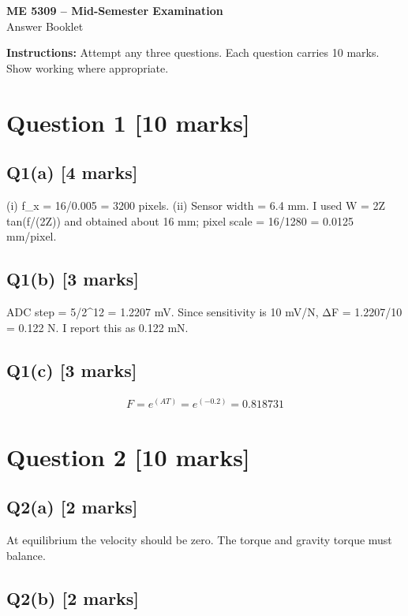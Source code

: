 \documentclass[11pt,a4paper]{article}
\begin{document}
\begin{center}
{\Large\bfseries ME 5309 -- Mid-Semester Examination}\\[3pt]
{\large Answer Booklet}\\[8pt]
\end{center}
\textbf{Instructions:} Attempt any three questions. Each question carries 10 marks. Show working where appropriate.
\section*{Question 1 \hfill [10 marks]}
\subsection*{Q1(a) \hfill [4 marks]}

(i) f\_x = 16/0.005 = 3200 pixels.
(ii) Sensor width = 6.4 mm.
I used W = 2Z tan(f/(2Z)) and obtained about 16 mm; pixel scale = 16/1280 = 0.0125 mm/pixel.

\subsection*{Q1(b) \hfill [3 marks]}

ADC step = 5/2\textasciicircum{}12 = 1.2207 mV.
Since sensitivity is 10 mV/N, ΔF = 1.2207/10 = 0.122 N.
I report this as 0.122 mN.

\subsection*{Q1(c) \hfill [3 marks]}

\[\begin{aligned}F = e^(AT) = e^(-0.2) = 0.818731\end{aligned}\]

\section*{Question 2 \hfill [10 marks]}
\subsection*{Q2(a) \hfill [2 marks]}

At equilibrium the velocity should be zero.
The torque and gravity torque must balance.

\subsection*{Q2(b) \hfill [2 marks]}
\end{document}
